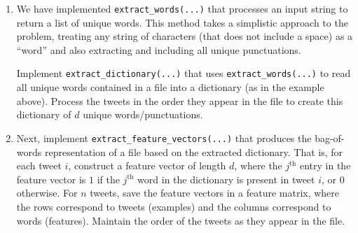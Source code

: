 \documentclass[11pt]{article}
\begin{document}
\begin{enumerate}


\item {} We have implemented \verb|extract_words(...)| that processes an input string to return a list of unique words. This method takes a simplistic approach to the problem, treating any string of characters (that does not include a space) as a ``word'' and also extracting and including all unique punctuations.

Implement \verb|extract_dictionary(...)| that uses \verb|extract_words(...)| to read all unique words contained in a file into a dictionary (as in the example above). Process the tweets in the order they appear in the file to create this dictionary of $d$ unique words/punctuations.


\item {} Next, implement \verb|extract_feature_vectors(...)| that produces the bag-of-words representation of a file based on the extracted dictionary. That is, for each tweet $i$, construct a feature vector of length $d$, where the $j^\textrm{th}$ entry in the feature vector is $1$ if the $j^\textrm{th}$ word in the dictionary is present in tweet $i$, or $0$ otherwise. For $n$ tweets, save the feature vectors in a feature matrix, where the rows correspond to tweets (examples) and the columns correspond to words (features). Maintain the order of the tweets as they appear in the file.


\end{enumerate}
\end{document}
